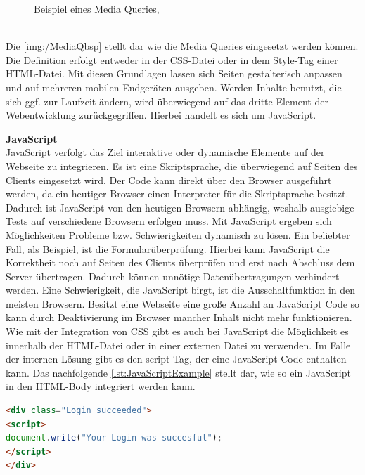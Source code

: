 \documentclass[a4paper,titlepage,halfparskip,12pt]{scrreprt}
\begin{document}
\begin{onehalfspacing}
\begin{figure}[h]
	\caption{Beispiel eines Media Queries, \cite{buhler2017html5}}
	\label{img:/MediaQbsp}
\end{figure}
\\Die \autoref{img:/MediaQbsp} stellt dar wie die Media Queries eingesetzt werden können. Die Definition erfolgt entweder in der \ac{CSS}-Datei oder in dem Style-Tag einer \ac{HTML}-Datei. Mit diesen Grundlagen lassen sich Seiten gestalterisch anpassen und auf mehreren mobilen Endgeräten ausgeben. Werden Inhalte benutzt, die sich ggf. zur Laufzeit ändern, wird überwiegend auf das dritte Element der Webentwicklung zurückgegriffen. Hierbei handelt es sich um JavaScript.\cite{buhler2017html5}

\textbf{JavaScript}\\
JavaScript verfolgt das Ziel interaktive oder dynamische Elemente auf der Webseite zu integrieren. Es ist eine Skriptsprache, die überwiegend auf Seiten des Clients eingesetzt wird. Der Code kann direkt über den Browser ausgeführt werden, da ein heutiger Browser einen Interpreter für die Skriptsprache besitzt. Dadurch ist JavaScript von den heutigen Browsern abhängig, weshalb ausgiebige Tests auf verschiedene Browsern erfolgen muss. Mit JavaScript ergeben sich Möglichkeiten Probleme bzw. Schwierigkeiten dynamisch zu lösen. Ein beliebter Fall, als Beispiel, ist die Formularüberprüfung. Hierbei kann JavaScript die Korrektheit noch auf Seiten des Clients überprüfen und erst nach Abschluss dem Server übertragen. Dadurch können unnötige Datenübertragungen verhindert werden. Eine Schwierigkeit, die JavaScript birgt, ist die Ausschaltfunktion in den meisten Browsern. Besitzt eine Webseite eine große Anzahl an JavaScript Code so kann durch Deaktivierung im Browser mancher Inhalt nicht mehr funktionieren. Wie mit der Integration von \ac{CSS} gibt es auch bei JavaScript die Möglichkeit es innerhalb der \ac{HTML}-Datei oder in einer externen Datei zu verwenden. Im Falle der internen Lösung gibt es den script-Tag, der eine JavaScript-Code enthalten kann. Das nachfolgende \autoref{lst:JavaScriptExample} stellt dar, wie so ein JavaScript in den HTML-Body integriert werden kann.
\begin{lstlisting}[language=HTML,caption=Example Listing of JavaScript-Code,label={lst:JavaScriptExample}]
<div class="Login_succeeded">
<script>
document.write("Your Login was succesful");
</script>
</div>
\end{lstlisting}

\end{onehalfspacing}
\end{document}
